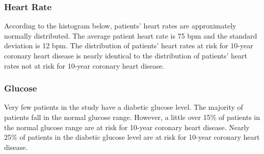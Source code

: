 \documentclass[10pt]{article}
\begin{document}
\subsubsection*{Heart Rate}

According to the histogram below, patients' heart rates are approximately normally distributed. The average patient heart rate is 75 bpm and the standard deviation is 12 bpm. The distribution of patients' heart rates at risk for 10-year coronary heart disease is nearly identical to the distribution of patients' heart rates not at risk for 10-year coronary heart disease.

\begin{figure}[hbt!]
\hspace*{\fill}
\centering
{}\hspace{2em}%
%
\hspace*{\fill}
\end{figure}


\subsubsection*{Glucose}

Very few patients in the study have a diabetic glucose level. The majority of patients fall in the normal glucose range. However, a little over 15\% of patients in the normal glucose range are at risk for 10-year coronary heart disease. Nearly 25\% of patients in the diabetic glucose level are at risk for 10-year coronary heart disease.
\end{document}
